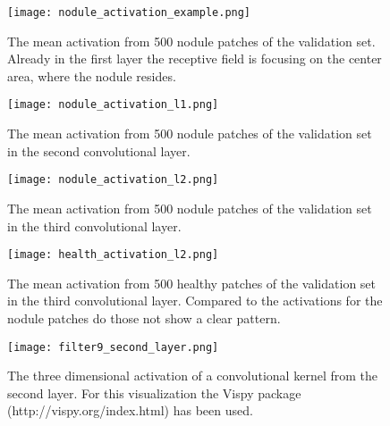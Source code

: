 \documentclass[main.tex]{subfiles}
\begin{document}
\begin{figure}[H]
\begin{center}
\texttt{[image: nodule\_activation\_example.png]}
\end{center}
\caption{The mean activation from 500 nodule patches of the validation set. Already in the first layer the receptive field is focusing on the center area, where the nodule resides.}
\label{fig:mean_activation}
\end{figure}

\begin{figure}
\begin{center}
\texttt{[image: nodule\_activation\_l1.png]}
\end{center}
\caption{The mean activation from 500 nodule patches of the validation set in the second convolutional layer.}
\label{fig:mean_activation_l1}
\end{figure}

\begin{figure}
\begin{center}
\texttt{[image: nodule\_activation\_l2.png]}
\end{center}
\caption{The mean activation from 500 nodule patches of the validation set in the third convolutional layer.}
\label{fig:mean_activation_l2}
\end{figure}

\begin{figure}
\begin{center}
\texttt{[image: health\_activation\_l2.png]}
\end{center}
\caption{The mean activation from 500 healthy patches of the validation set in the third convolutional layer. Compared to the activations for the nodule patches do those not show a clear pattern.}
\label{fig:mean_activation_l2_health}
\end{figure}


\begin{figure}
\begin{center}
\texttt{[image: filter9\_second\_layer.png]}
\end{center}
\caption{The three dimensional activation of a convolutional kernel from the second layer. For this visualization the Vispy package (http://vispy.org/index.html) has been used.}
\label{fig:3d_activation}
\end{figure}
\end{document}
